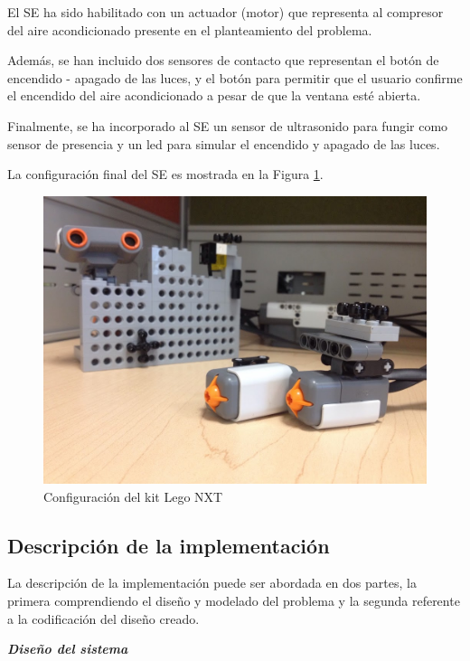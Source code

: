 \documentclass[journal]{IEEEtran}
\begin{document}
El SE ha sido habilitado con un actuador (motor) que representa al compresor del aire acondicionado presente en el planteamiento del problema.

Además, se han incluido dos sensores de contacto que representan el botón de encendido - apagado de las luces, y el botón para permitir que el usuario confirme el encendido del aire acondicionado a pesar de que la ventana esté abierta.

Finalmente, se ha incorporado al SE un sensor de ultrasonido para fungir como sensor de presencia y un led para simular el encendido y apagado de las luces.

La configuración final del SE es mostrada en la Figura \ref{fig:configuracion-lego}.

\begin{figure}[!t]
\centering
\includegraphics[width=\columnwidth]{diagramas/configuracion-lego2}
\caption{Configuración del kit Lego NXT}
\label{fig:configuracion-lego}
\end{figure}

\subsection{Descripción de la implementación}
\label{sub:metodologia-modelado-statechart}

La descripción de la implementación puede ser abordada en dos partes, la primera comprendiendo el diseño y modelado del problema y la segunda referente a la codificación del diseño creado.

\textbf{\emph{Diseño del sistema}}
\end{document}

